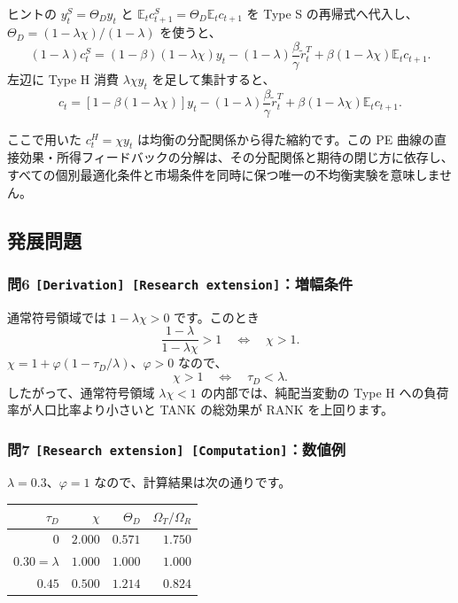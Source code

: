 \documentclass[
  japanese,
  lualatex,
  ja=standard,
  11pt,
  a4paper]{ltjsarticle}
\newcounter{none} %
\begin{document}
ヒントの \(y_t^S=\Theta_Dy_t\) と
\(\mathbb E_tc_{t+1}^S=\Theta_D\mathbb E_tc_{t+1}\) を Type S
の再帰式へ代入し、\(\Theta_D=(1-\lambda\chi)/(1-\lambda)\) を使うと、 \[
(1-\lambda)c_t^S
=(1-\beta)(1-\lambda\chi)y_t
-(1-\lambda)\frac\beta\gamma\widetilde r_t^T
+\beta(1-\lambda\chi)\mathbb E_tc_{t+1}.
\] 左辺に Type H 消費 \(\lambda\chi y_t\) を足して集計すると、 \[
c_t
=\left[1-\beta(1-\lambda\chi)\right]y_t
-(1-\lambda)\frac\beta\gamma\widetilde r_t^T
+\beta(1-\lambda\chi)\mathbb E_tc_{t+1}.
\]

ここで用いた \(c_t^H=\chi y_t\) は均衡の分配関係から得た縮約です。この
PE
曲線の直接効果・所得フィードバックの分解は、その分配関係と期待の閉じ方に依存し、すべての個別最適化条件と市場条件を同時に保つ唯一の不均衡実験を意味しません。

\subsection{発展問題}\label{ux767aux5c55ux554fux984c-11}

\subsubsection{\texorpdfstring{問6
\texttt{{[}Derivation{]}\ {[}Research\ extension{]}}：増幅条件}{問6 {[}Derivation{]} {[}Research extension{]}：増幅条件}}\label{ux554f6-derivation-research-extensionux5897ux5e45ux6761ux4ef6}

通常符号領域では \(1-\lambda\chi>0\) です。このとき \[
\frac{1-\lambda}{1-\lambda\chi}>1
\quad\Longleftrightarrow\quad
\chi>1.
\] \(\chi=1+\varphi(1-\tau_D/\lambda)\)、\(\varphi>0\) なので、 \[
\chi>1
\quad\Longleftrightarrow\quad
\tau_D<\lambda.
\] したがって、通常符号領域 \(\lambda\chi<1\) の内部では、純配当変動の
Type H への負荷率が人口比率より小さいと TANK の総効果が RANK
を上回ります。

\subsubsection{\texorpdfstring{問7
\texttt{{[}Research\ extension{]}\ {[}Computation{]}}：数値例}{問7 {[}Research extension{]} {[}Computation{]}：数値例}}\label{ux554f7-research-extension-computationux6570ux5024ux4f8b}

\(\lambda=0.3\)、\(\varphi=1\) なので、計算結果は次の通りです。

{\def\LTcaptype{none} %
\begin{longtable}[]{@{}rrrr@{}}
\toprule\noalign{}
\(\tau_D\) & \(\chi\) & \(\Theta_D\) & \(\Omega_T/\Omega_R\) \\
\midrule\noalign{}
\endhead
\bottomrule\noalign{}
\endlastfoot
\(0\) & \(2.000\) & \(0.571\) & \(1.750\) \\
\(0.30=\lambda\) & \(1.000\) & \(1.000\) & \(1.000\) \\
\(0.45\) & \(0.500\) & \(1.214\) & \(0.824\) \\
\end{longtable}
}
\end{document}
